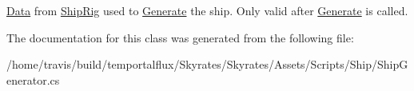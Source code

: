 \hyperlink{namespace_skyrates_1_1_data}{Data} from \hyperlink{class_skyrates_1_1_ship_1_1_ship_rig}{Ship\-Rig} used to \hyperlink{class_skyrates_1_1_ship_1_1_ship_generator_a98648e2db2bd204cd7a470df9f8745d5}{Generate} the ship. Only valid after \hyperlink{class_skyrates_1_1_ship_1_1_ship_generator_a98648e2db2bd204cd7a470df9f8745d5}{Generate} is called. 



The documentation for this class was generated from the following file\-:\begin{DoxyCompactItemize}
\item 
/home/travis/build/temportalflux/\-Skyrates/\-Skyrates/\-Assets/\-Scripts/\-Ship/Ship\-Generator.\-cs\end{DoxyCompactItemize}
